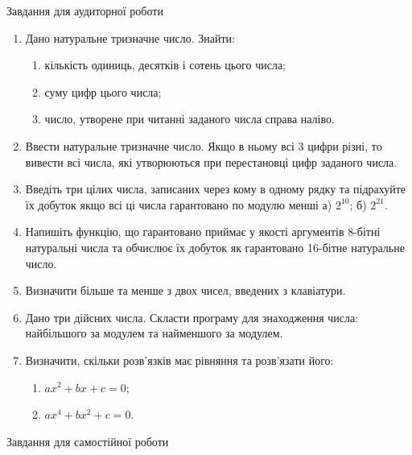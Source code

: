 \documentclass[]{article}
\makeatletter
\newcommand{\xslalph}[1]{\expandafter\@xslalph\csname c@#1\endcsname}
\newcommand{\@xslalph}[1]{%
    \ifcase#1\or а\or б\or в\or г\or д\or e\or є\or ж\or з\or i%
    \or й\or к\or л\or м\or н\or о\or п\or р\or с\or т%
    \or у\or ф\or х\or ц\or ч\or ш\or ю\or я\or аа\or бб\or вв%
    \else\@ctrerr\fi%
}
\makeatother
\begin{document}
Завдання для аудиторної роботи
\begin{enumerate}
\def\labelenumi{\arabic{enumi})}
\item
Дано натуральне тризначне число. Знайти:
  \begin{enumerate}[label=\xslalph*)]
\item кількість одиниць, десятків і сотень цього числа;
\item суму цифр цього числа;
\item число, утворене при читанні заданого числа справа наліво.
\end{enumerate}

\item
Ввести натуральне тризначне число. Якщо в ньому всі 3 цифри різні, то
вивести всі числа, які утворюються при перестановці цифр заданого числа.
\item
Введіть три цілих числа, записаних через кому в одному рядку та
підрахуйте їх добуток якщо всі ці числа гарантовано по модулю менші а)
\(2^{10}\); б) \(2^{21}\).

\item
Напишіть функцію, що гарантовано приймає у якості аргументів 8-бітні
натуральні числа та обчислює їх добуток як гарантовано 16-бітне
натуральне число.
\item
Визначити більше та менше з двох чисел, введених з клавіатури.
\item
Дано три дійсних числа. Скласти програму для знаходження числа:
найбільшого за модулем та найменшого за модулем.
\item
Визначити, скільки розв'язків має рівняння та розв'язати його:
  \begin{enumerate}[label=\xslalph*)]
\item \(ax^{2} + bx + c = 0\);
\item \(ax^{4} + bx^{2} + c = 0\).
  \end{enumerate}
\end{enumerate}

Завдання для самостійної роботи
\end{document}

